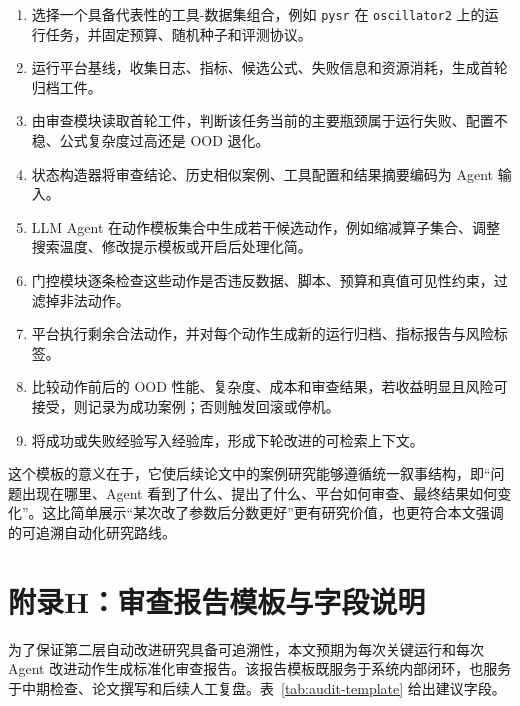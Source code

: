 \documentclass[UTF8,12pt]{ctexart}
\begin{document}
\begin{enumerate}
    \item 选择一个具备代表性的工具-数据集组合，例如 \texttt{pysr} 在 \texttt{oscillator2} 上的运行任务，并固定预算、随机种子和评测协议。
    \item 运行平台基线，收集日志、指标、候选公式、失败信息和资源消耗，生成首轮归档工件。
    \item 由审查模块读取首轮工件，判断该任务当前的主要瓶颈属于运行失败、配置不稳、公式复杂度过高还是 OOD 退化。
    \item 状态构造器将审查结论、历史相似案例、工具配置和结果摘要编码为 Agent 输入。
    \item LLM Agent 在动作模板集合中生成若干候选动作，例如缩减算子集合、调整搜索温度、修改提示模板或开启后处理化简。
    \item 门控模块逐条检查这些动作是否违反数据、脚本、预算和真值可见性约束，过滤掉非法动作。
    \item 平台执行剩余合法动作，并对每个动作生成新的运行归档、指标报告与风险标签。
    \item 比较动作前后的 OOD 性能、复杂度、成本和审查结果，若收益明显且风险可接受，则记录为成功案例；否则触发回滚或停机。
    \item 将成功或失败经验写入经验库，形成下轮改进的可检索上下文。
\end{enumerate}

这个模板的意义在于，它使后续论文中的案例研究能够遵循统一叙事结构，即“问题出现在哪里、Agent 看到了什么、提出了什么、平台如何审查、最终结果如何变化”。这比简单展示“某次改了参数后分数更好”更有研究价值，也更符合本文强调的可追溯自动化研究路线。

\section{附录H：审查报告模板与字段说明}

为了保证第二层自动改进研究具备可追溯性，本文预期为每次关键运行和每次 Agent 改进动作生成标准化审查报告。该报告模板既服务于系统内部闭环，也服务于中期检查、论文撰写和后续人工复盘。表~\ref{tab:audit-template} 给出建议字段。
\end{document}

